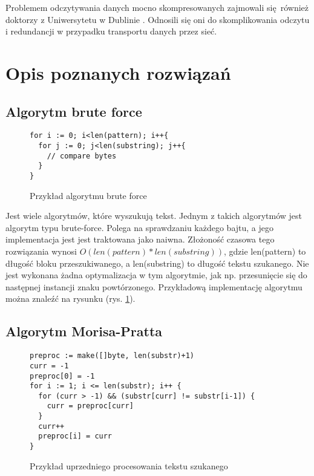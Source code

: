 Problemem odczytywania danych mocno skompresowanych zajmowali się również 
doktorzy z Uniwersytetu w Dublinie \cite{bib:internet:KompresjaDanych}. Odnosili
się oni do skomplikowania odczytu i redundancji w przypadku transportu danych
przez sieć.

\section{Opis poznanych rozwiązań}

\subsection{Algorytm brute force}

\begin{figure}[h]
  \centering
  \begin{lstlisting}
for i := 0; i<len(pattern); i++{
  for j := 0; j<len(substring); j++{
    // compare bytes
  }
}
  \end{lstlisting}
  \caption{Przykład algorytmu brute force}
  \label{fig:code:bruteForceComparison}
\end{figure}

Jest wiele algorytmów, które wyszukują tekst. Jednym z takich algorytmów jest 
algorytm typu brute-force. Polega na sprawdzaniu każdego bajtu, a jego implementacja
jest jest traktowana jako naiwna. Złożoność czasowa tego rozwiązania wynosi
$O(len(pattern) * len(substring))$, gdzie len(pattern) to długość bloku 
przeszukiwanego, a len(substring) to długość tekstu szukanego. Nie jest wykonana
żadna optymalizacja w tym algorytmie, jak np. przesunięcie się do następnej
 instancji znaku powtórzonego. Przykładową implementację algorytmu można znaleźć
  na rysunku (rys. \ref{fig:code:bruteForceComparison}).


\subsection{Algorytm Morisa-Pratta}

\begin{figure}[h]
  \centering
  \begin{lstlisting}
preproc := make([]byte, len(substr)+1)
curr = -1
preproc[0] = -1
for i := 1; i <= len(substr); i++ {
  for (curr > -1) && (substr[curr] != substr[i-1]) {
    curr = preproc[curr]
  }
  curr++
  preproc[i] = curr
}
  \end{lstlisting}
  \caption{Przykład uprzedniego procesowania tekstu szukanego}
  \label{fig:code:preprocessMorisPratt}
\end{figure}

